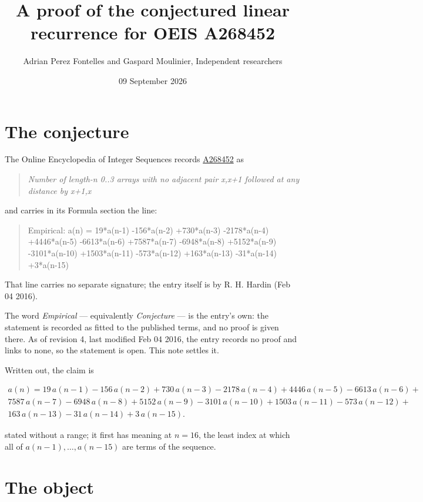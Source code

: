 \documentclass[11pt]{article}
\title{A proof of the conjectured linear recurrence for OEIS A268452}
\author{Adrian Perez Fontelles and Gaspard Moulinier, Independent researchers}
\date{09 September 2026}
\theoremstyle{definition}
\begin{document}
\maketitle
\section{The conjecture}

The Online Encyclopedia of Integer Sequences records \href{https://oeis.org/A268452}{A268452} as

\begin{quote}\itshape Number of length-n 0..3 arrays with no adjacent pair x,x+1 followed at any distance by x+1,x\end{quote}

and carries in its Formula section the line:

\begin{quote}\ttfamily Empirical: a(n) = 19*a(n-1) -156*a(n-2) +730*a(n-3) -2178*a(n-4) +4446*a(n-5) -6613*a(n-6) +7587*a(n-7) -6948*a(n-8) +5152*a(n-9) -3101*a(n-10) +1503*a(n-11) -573*a(n-12) +163*a(n-13) -31*a(n-14) +3*a(n-15)\end{quote}

That line carries no separate signature; the entry itself is by R. H. Hardin (Feb 04 2016).

The word {\itshape Empirical} --- equivalently {\itshape Conjecture} --- is the entry's own: the statement is recorded as fitted to the published terms, and no proof is given there. As of revision 4, last modified Feb 04 2016, the entry records no proof and links to none, so the statement is open. This note settles it.

Written out, the claim is

\begin{multline*} a(n) = 19\,a(n-1) - 156\,a(n-2) + 730\,a(n-3) - 2178\,a(n-4) + 4446\,a(n-5) - 6613\,a(n-6) + \\ 7587\,a(n-7) - 6948\,a(n-8) + 5152\,a(n-9) - 3101\,a(n-10) + 1503\,a(n-11) - 573\,a(n-12) + \\ 163\,a(n-13) - 31\,a(n-14) + 3\,a(n-15). \end{multline*}

stated without a range; it first has meaning at $n = 16$, the least index at which all of $a(n-1),\dots,a(n-15)$ are terms of the sequence.

\section{The object}
\end{document}
